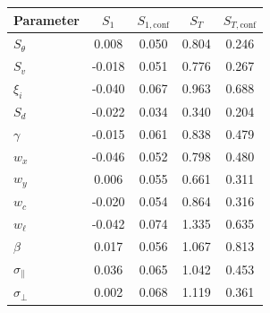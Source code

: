 \begin{tabular}{lcccc}
\hline
Parameter & \(S_1\) & \(S_{1,\mathrm{conf}}\) & \(S_T\) & \(S_{T,\mathrm{conf}}\)\\
\hline
\(S_{\theta}\) & 0.008 & 0.050 & 0.804 & 0.246\\
\(S_v\) & -0.018 & 0.051 & 0.776 & 0.267\\
\(\xi_i\) & -0.040 & 0.067 & 0.963 & 0.688\\
\(S_d\) & -0.022 & 0.034 & 0.340 & 0.204\\
\(\gamma\) & -0.015 & 0.061 & 0.838 & 0.479\\
\(w_x\) & -0.046 & 0.052 & 0.798 & 0.480\\
\(w_y\) & 0.006 & 0.055 & 0.661 & 0.311\\
\(w_c\) & -0.020 & 0.054 & 0.864 & 0.316\\
\(w_{\ell}\) & -0.042 & 0.074 & 1.335 & 0.635\\
\(\beta\) & 0.017 & 0.056 & 1.067 & 0.813\\
\(\sigma_{\parallel}\) & 0.036 & 0.065 & 1.042 & 0.453\\
\(\sigma_{\perp}\) & 0.002 & 0.068 & 1.119 & 0.361\\
\hline
\end{tabular}
